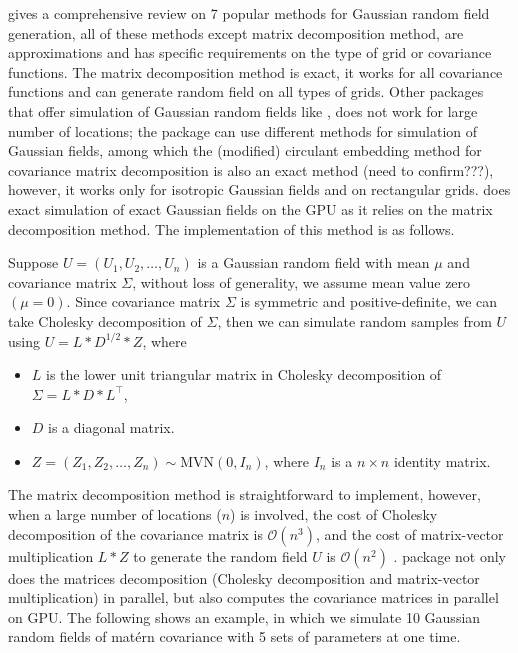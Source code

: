 \documentclass[article,nojss]{jss}\usepackage[]{graphicx}\usepackage[]{color}
\begin{document}
\cite{LiuandLi2019} gives a comprehensive review on 7 popular methods for Gaussian random field generation, %
all of these methods except matrix decomposition method, are approximations and has specific requirements on the type of grid or covariance functions. The matrix decomposition method is exact, it works for all covariance functions and can generate random field on all types of grids. Other  packages that offer simulation of Gaussian random fields like  \citep{geoR2001}, does not work for large number of locations; the  \citep{RandomFields2015,RandomFields2020} package can use different methods for simulation of Gaussian fields, among which the (modified) circulant embedding method \citep{Dietrich1997FastAE} for covariance matrix decomposition is also an exact method (need to confirm???), however, it works only for isotropic Gaussian fields and on rectangular grids.  does exact simulation of exact Gaussian fields on the GPU as it relies on the matrix decomposition method. The implementation of this method is as follows.


Suppose $U=(U_1, U_2, \dots, U_n)$ is a Gaussian random field with mean $\mu$ and covariance matrix $\Sigma$, without loss of generality, we assume mean value zero $(\mu = 0)$. Since covariance matrix $\Sigma$ is symmetric and positive-definite, we can take Cholesky decomposition of $\Sigma$, then we can simulate random samples from $U$ using $U=L*D^{1/2}*Z$, where 
\begin{itemize}
\itemsep0em 
\item $L$ is the lower unit triangular matrix in Cholesky decomposition of $\Sigma = L*D*L^\top$,
\item $D$ is a diagonal matrix.
\item $Z=(Z_1, Z_2, \dots, Z_n) \sim \text{MVN}(0,I_n)$, where $I_n$ is a $n \times n$ identity matrix.
\end{itemize}
The matrix decomposition method is straightforward to implement, however, when a large number of locations ($n$) is involved, the cost of Cholesky decomposition of the covariance matrix is $\mathcal{O}(n^3)$,  and the cost of matrix-vector multiplication $L*Z$ to generate the random field $U$ is $\mathcal{O}(n^2)$ \citep{LiuandLi2019}.   package not only does the matrices decomposition (Cholesky decomposition and matrix-vector multiplication) in parallel, but also computes the covariance matrices in parallel on GPU. The following shows an example, in which we simulate 10 Gaussian random fields of mat\'ern covariance with 5 sets of parameters at one time. %
\end{document}
